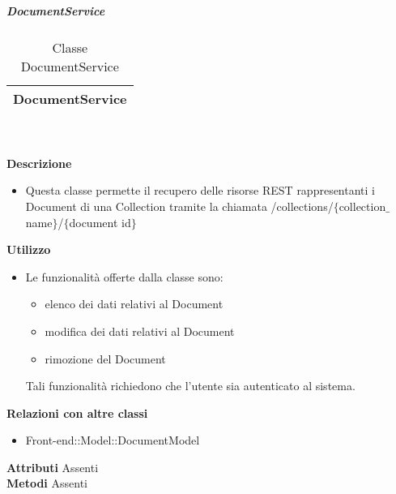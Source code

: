 			\subparagraph{DocumentService} 
\begin{table}[ht]
\begin{center}
\bgroup
	\setlength{\arrayrulewidth}{0.6mm}
	\def\arraystretch{1}
		\begin{tabular}{ | p{12cm} | }
				\hline  
					\centerline{\textbf{DocumentService}}
		\\ \hline 
				\hline
				\hline
		
		\end{tabular}
\egroup
\caption{Classe DocumentService}
\end{center}
\end{table} \textbf{\\ \\ Descrizione}
\begin{itemize}
\item[] Questa classe permette il recupero delle risorse REST rappresentanti i Document di una Collection tramite la chiamata /collections/$\{$collection$\_$name$\}$/$\{$document id$\}$
\end{itemize} 
\textbf{Utilizzo}
\begin{itemize}
\item[] Le funzionalità offerte dalla classe sono: 
\begin{itemize} 
\item elenco dei dati relativi al Document 
\item modifica dei dati relativi al Document
\item rimozione del Document 
\end{itemize} 
Tali funzionalità richiedono che l'utente sia autenticato al sistema.
\end{itemize}
\textbf{Relazioni con altre classi}
\begin{itemize}
\item{Front-end::Model::DocumentModel}
\end{itemize}
\textbf{Attributi}
Assenti \\
\textbf{Metodi}
Assenti \\


